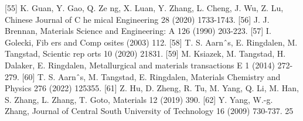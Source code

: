 \documentclass[10pt, letterpaper]{article}
\begin{document}
[55]
 K. Guan, Y. Gao, Q. Ze ng, X. Luan, Y. Zhang, L. Cheng, J. Wu, Z. Lu, Chinese Journal of C he mical
Engineering 28 (2020) 1733-1743.
[56]
 J. J. Brennan, Materials Science and Engineering: A 126 (1990) 203-223.
[57]
 I. Golecki, Fib ers and Comp osites (2003) 112.
[58]
 T. S. Aarnˆs, E. Ringdalen, M. Tangstad, Scientic rep orts 10 (2020) 21831.
[59]
 M. Ksiazek, M. Tangstad, H. Dalaker, E. Ringdalen, Metallurgical and materials transactions E 1 (2014)
272-279.
[60]
 T. S. Aarnˆs, M. Tangstad, E. Ringdalen, Materials Chemistry and Physics 276 (2022) 125355.
[61]
 Z. Hu, D. Zheng, R. Tu, M. Yang, Q. Li, M. Han, S. Zhang, L. Zhang, T. Goto, Materials 12 (2019)
390.
[62]
 Y. Yang, W.-g. Zhang, Journal of Central South University of Technology 16 (2009) 730-737.
25

\end{document}
